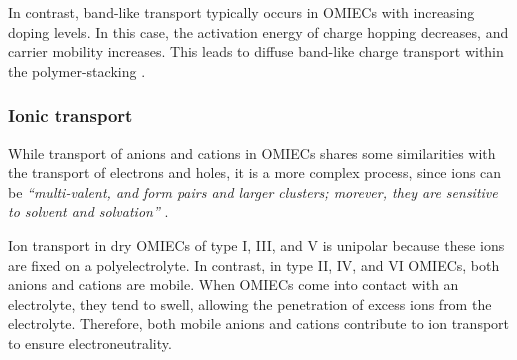 In contrast, band-like transport typically occurs in OMIECs with increasing doping levels. In this case, the activation energy of charge hopping decreases, and carrier mobility increases. This leads to diffuse band-like charge transport within the polymer-stacking \cite{wangHoppingTransportHall2012}.



\subsubsection{Ionic transport}
While transport of anions and cations in OMIECs shares some similarities with the transport of electrons and holes, it is a more complex process, since ions can be \textit{``multi-valent, and form pairs and larger clusters; morever, they are sensitive to solvent and solvation''} \cite{paulsenOrganicMixedIonic2020}.

Ion transport in dry OMIECs of type I, III, and V is unipolar because these ions are fixed on a polyelectrolyte. In contrast, in type II, IV, and VI OMIECs, both anions and cations are mobile. When OMIECs come into contact with an electrolyte, they tend to swell, allowing the penetration of excess ions from the electrolyte. Therefore, both mobile anions and cations contribute to ion transport to ensure electroneutrality. 

